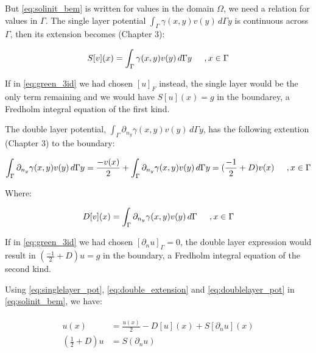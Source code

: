 But \ref{eq:solinit_bem} is written for values in the domain $\Omega$, we need a relation for values in $\Gamma$. The single layer potential $\int_{\Gamma} \gamma(x,y)v(y) \,d\Gamma y$ is continuous across $\Gamma$, then its extension becomes \cite{sauter-bem}(Chapter 3):

\begin{equation}\label{eq:singlelayer_pot}
    S[v](x) = \int_{\Gamma} \gamma(x,y)v(y) \,d\Gamma y \hspace{0.2in}, x \in \Gamma
\end{equation}

If in \ref{eq:green_3id} we had chosen $[u]_{F}$ instead, the single layer would be the only term remaining and we would have $S[u](x) = g$ in the boundarey, a Fredholm integral equation of the first kind.

The double layer potential, $\int_{\Gamma}  \partial_{n_{y}}\gamma(x,y) v(y) \,d\Gamma y$, has the following extention \cite{sauter-bem}(Chapter 3) to the boundary:

\begin{equation}\label{eq:double_extension}
    \int_{\Gamma}  \partial_{n_{y}}\gamma(x,y) v(y) \,d\Gamma y = \frac{-v(x)}{2} + \int_{\Gamma} \partial_{n_{y}}\gamma(x,y)v(y) \,d\Gamma y = (\frac{-1}{2} + D)v(x)\hspace{0.2in}, x \in \Gamma
\end{equation}

Where:

\begin{equation}\label{eq:doublelayer_pot}
    D[v](x) = \int_{\Gamma} \partial_{n_{y}}\gamma(x,y)v(y) \,d\Gamma \hspace{0.2in}, x \in \Gamma
\end{equation}

If in \ref{eq:green_3id} we had chosen $[\partial_{n}u]_{\Gamma} = 0$, the double layer expression would result in $(\frac{-1}{2} + D)u = g$ in the boundary, a Fredholm integral equation of the second kind.


Using \ref{eq:singlelayer_pot}, \ref{eq:double_extension} and \ref{eq:doublelayer_pot} in \ref{eq:solinit_bem}, we have:

\begin{align}\label{eq:sol_bem}
    \begin{split}
        u(x) & = \frac{u(x)}{2} - D[u](x) + S[\partial_{n}u](x)\\
        (\frac{1}{2} + D) u & = S(\partial_{n}u)
    \end{split}
\end{align}

